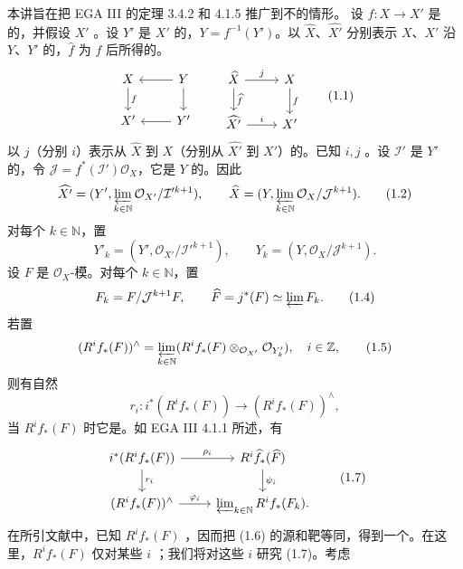 本讲旨在把 EGA III 的定理 3.4.2 和 4.1.5 推广到不的情形。
设 $f:X\to X'$ 是的，并假设 $X'$ 。设 $Y'$ 是 $X'$ 的，$Y=f^{-1}(Y')$。以 $\widehat X$、$\widehat{X'}$ 分别表示 $X$、$X'$ 沿 $Y$、$Y'$ 的，$\widehat f$ 为 $f$ 后所得的。
\[\begin{tikzcd}X\arrow[d,"f" ]&Y\arrow[l]\arrow[d]\\X'&Y'\arrow[l]\end{tikzcd}\qquad
\begin{tikzcd}\widehat X\arrow[r,"j"]\arrow[d,"\widehat f" ]&X\arrow[d,"f"]\\\widehat{X'}\arrow[r,"i"]&X'\end{tikzcd}\tag{1.1}\]
以 $j$（分别 $i$）表示从 $\widehat X$ 到 $X$（分别从 $\widehat{X'}$ 到 $X'$）的。已知 $i,j$ 。设 $\mathcal I'$ 是 $Y'$ 的，令 $\mathcal J=f^*(\mathcal I')\mathcal O_X$，它是 $Y$ 的。因此
\[\widehat{X'}=(Y',\varprojlim_{k\in\mathbb N}\mathcal O_{X'}/\mathcal I'^{k+1}),\qquad
\widehat X=(Y,\varprojlim_{k\in\mathbb N}\mathcal O_X/\mathcal J^{k+1}).\tag{1.2}\]
对每个 $k\in\mathbb N$，置
\[Y'_k=(Y',\mathcal O_{X'}/\mathcal I'^{k+1}),\qquad Y_k=(Y,\mathcal O_X/\mathcal J^{k+1}).\tag{1.3}\]
设 $F$ 是 $\mathcal O_X$-模。对每个 $k\in\mathbb N$，置
\[F_k=F/\mathcal J^{k+1}F,\qquad \widehat F=j^*(F)\simeq\varprojlim F_k.\tag{1.4}\]
若置
\[(R^if_*(F))^\wedge=\varprojlim_{k\in\mathbb N}(R^if_*(F)\otimes_{\mathcal O_{X'}}\mathcal O_{Y'_k}),\quad i\in\mathbb Z,\tag{1.5}\]
则有自然
\[r_i:i^*(R^if_*(F))\longrightarrow (R^if_*(F))^\wedge,\tag{1.6}\]
当 $R^if_*(F)$ 时它是。如 EGA III 4.1.1 所述，有
\[\begin{tikzcd}
i^*(R^if_*(F))\arrow[r,"\rho_i"]\arrow[d,"r_i" ]&R^i\widehat f_*(\widehat F)\arrow[d,"\psi_i"]\\
(R^if_*(F))^\wedge\arrow[r,"\varphi_i"]&\varprojlim_{k\in\mathbb N}R^if_*(F_k).
\end{tikzcd}\tag{1.7}\]
在所引文献中，已知 $R^if_*(F)$ ，因而把 (1.6) 的源和靶等同，得到一个。在这里，$R^if_*(F)$ 仅对某些 $i$ ；我们将对这些 $i$ 研究 (1.7)。考虑
